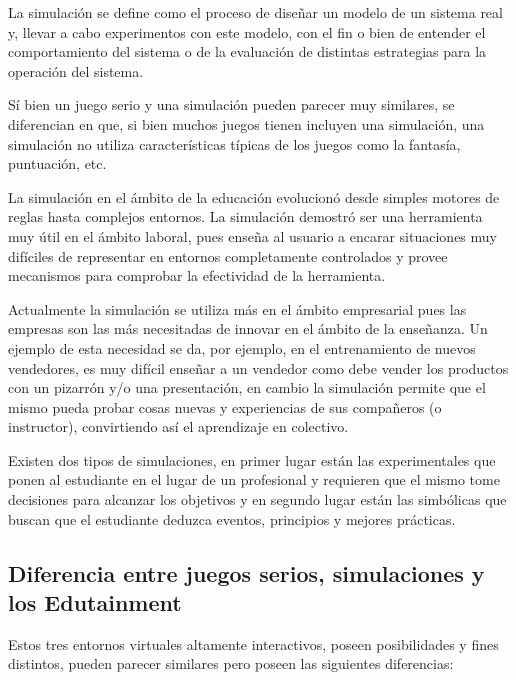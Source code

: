 La simulación se define como el proceso de diseñar un modelo de un sistema real
y, llevar a cabo experimentos con este modelo, con el fin o bien de entender el
comportamiento del sistema o de la evaluación de distintas estrategias para la
operación del sistema\cite{ingalls2008introduction}. 

Sí bien un juego serio y una simulación pueden parecer muy similares, se
diferencian en que, si bien muchos juegos tienen incluyen una simulación, una
simulación no utiliza características típicas de los juegos como la fantasía,
puntuación, etc\cite{sg:aoverview}.

La simulación en el ámbito de la educación evolucionó desde simples motores de
reglas hasta complejos entornos. La simulación demostró ser una herramienta muy
útil en el ámbito laboral\cite{mariluz:seiousgames}, pues enseña al usuario a
encarar situaciones muy difíciles de representar en entornos completamente
controlados y provee mecanismos para comprobar la efectividad de la herramienta. 

Actualmente la simulación se utiliza más en el ámbito empresarial pues las
empresas son las más necesitadas de innovar en el ámbito de la enseñanza. Un
ejemplo de esta necesidad se da, por ejemplo, en el entrenamiento de nuevos
vendedores, es muy difícil enseñar a un vendedor como debe vender los productos
con un pizarrón y/o una presentación, en cambio la simulación permite que el
mismo pueda probar cosas nuevas y experiencias de sus compañeros (o instructor),
convirtiendo así el aprendizaje en colectivo\cite{mariluz:seiousgames}.

Existen dos tipos de simulaciones, en primer lugar están las experimentales que
ponen al estudiante en el lugar de un profesional y requieren que el mismo tome
decisiones para alcanzar los objetivos y en segundo lugar están las simbólicas
que buscan que el estudiante deduzca eventos, principios y mejores
prácticas\cite{charsky:2010}. 


\subsection{Diferencia entre juegos serios, simulaciones y los Edutainment}

Estos tres entornos virtuales altamente interactivos, poseen posibilidades y
fines distintos, pueden parecer similares pero poseen las siguientes
diferencias\cite{education:games}:

